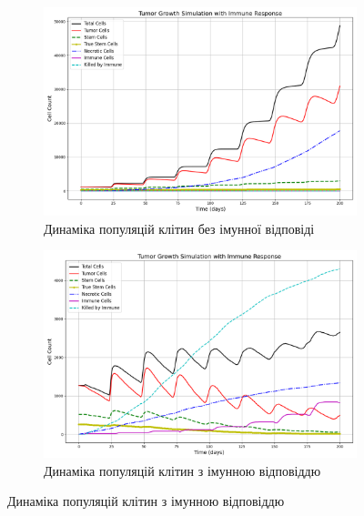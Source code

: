 \documentclass{article}
\begin{document}
\begin{figure}[H]
    \centering
    \begin{subfigure}[t]{1.1\linewidth}
        \centering
        \includegraphics[width=\linewidth]{tumor_simulation_stats/tumor_stats.png}
        \caption{Динаміка популяцій клітин без імунної відповіді}
        \label{fig:tumor-stats-no-immune}
    \end{subfigure}

    \begin{subfigure}[t]{1.1\linewidth}
        \centering
        \includegraphics[width=\linewidth]{tumor_immune_simulation_stats/tumor_immune_stats.png}
        \caption{Динаміка популяцій клітин з імунною відповіддю}
        \label{fig:tumor-stats-immune}
    \end{subfigure}
    \label{fig:stats-comparison}
\end{figure}
\end{document}
